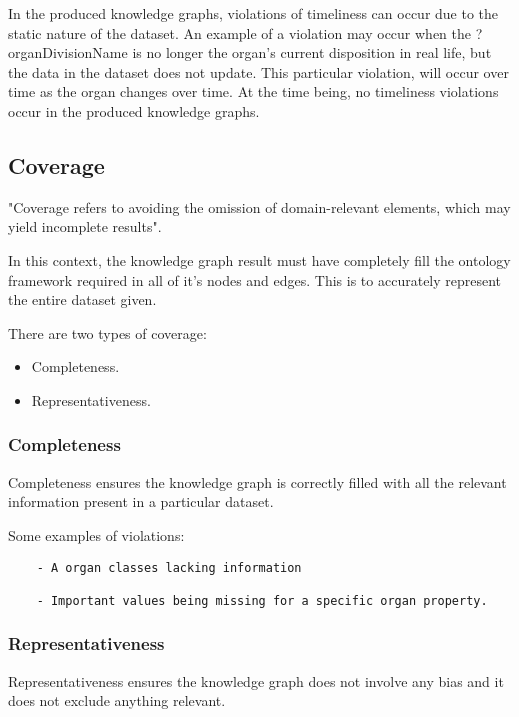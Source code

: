 In the produced knowledge graphs, violations of timeliness can occur due to the static nature of the dataset. An example of a violation may occur when the ?organDivisionName is no longer the organ's current disposition in real life, but the data in the dataset does not update. This particular violation, will occur over time as the organ changes over time. At the time being, no timeliness violations occur in the produced knowledge graphs.

\subsection{Coverage}
\hspace{0.5cm} "Coverage refers to avoiding the omission of domain-relevant elements, which may yield incomplete results". \cite{knowledgegraphevaulationbook}

In this context, the knowledge graph result must have completely fill the ontology framework required in all of it's nodes and edges. This is to accurately represent the entire dataset given. 

There are two types of coverage: 
\begin{itemize}
\itemsep0em 
\item Completeness.
\item Representativeness.
\end{itemize}

\subsubsection{Completeness}
\hspace{0.5cm} Completeness ensures the knowledge graph is correctly filled with all the relevant information present in a particular dataset. \cite{knowledgegraphevaulationbook}

Some examples of violations: 
\begin{lstlisting}
    - A organ classes lacking information

    - Important values being missing for a specific organ property. 
\end{lstlisting}

\subsubsection{Representativeness}
\hspace{0.5cm} Representativeness ensures the knowledge graph does not involve any bias and it does not exclude anything relevant. \cite{knowledgegraphevaulationbook}

